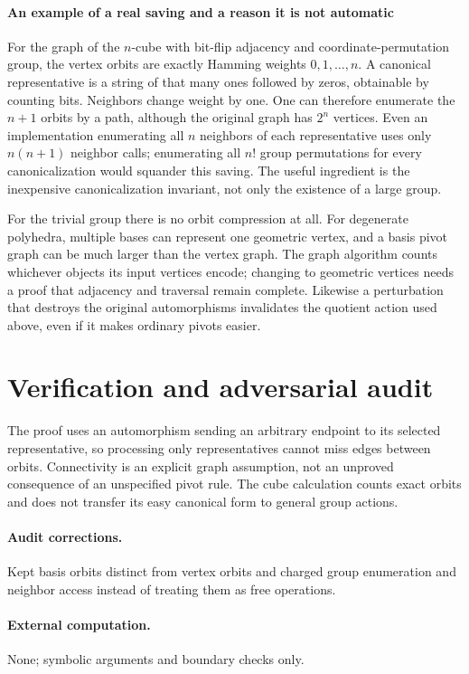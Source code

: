 \documentclass[11pt]{article}
\begin{document}
\paragraph{An example of a real saving and a reason it is not automatic}
For the graph of the $n$-cube with bit-flip adjacency and coordinate-permutation group, the vertex orbits are exactly Hamming weights $0,1,\ldots,n$. A canonical representative is a string of that many ones followed by zeros, obtainable by counting bits. Neighbors change weight by one. One can therefore enumerate the $n+1$ orbits by a path, although the original graph has $2^n$ vertices. Even an implementation enumerating all $n$ neighbors of each representative uses only $n(n+1)$ neighbor calls; enumerating all $n!$ group permutations for every canonicalization would squander this saving. The useful ingredient is the inexpensive canonicalization invariant, not only the existence of a large group.

For the trivial group there is no orbit compression at all. For degenerate polyhedra, multiple bases can represent one geometric vertex, and a basis pivot graph can be much larger than the vertex graph. The graph algorithm counts whichever objects its input vertices encode; changing to geometric vertices needs a proof that adjacency and traversal remain complete. Likewise a perturbation that destroys the original automorphisms invalidates the quotient action used above, even if it makes ordinary pivots easier.

\section{Verification and adversarial audit}
The proof uses an automorphism sending an arbitrary endpoint to its selected representative, so processing only representatives cannot miss edges between orbits. Connectivity is an explicit graph assumption, not an unproved consequence of an unspecified pivot rule. The cube calculation counts exact orbits and does not transfer its easy canonical form to general group actions.
\paragraph{Audit corrections.} Kept basis orbits distinct from vertex orbits and charged group enumeration and neighbor access instead of treating them as free operations.
\paragraph{External computation.} None; symbolic arguments and boundary checks only.
\end{document}
